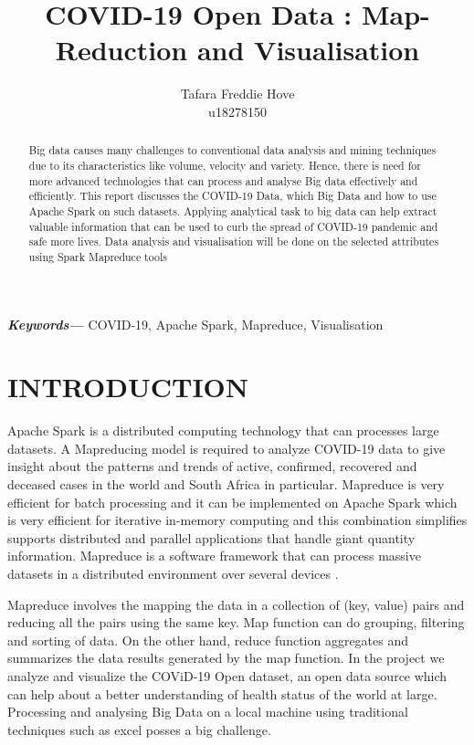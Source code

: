 \documentclass[11pt]{article}
\title{COVID-19 Open Data : Map-Reduction and Visualisation}
\author{Tafara Freddie Hove \\
        \small u18278150 \\
}
\date{}
\providecommand{\keywords}[1]
{
  \small	
  \textbf{\textit{Keywords---}} #1 
}
\begin{document}
\maketitle
\begin{abstract}


Big data  causes many challenges to conventional data analysis and mining  techniques due to its characteristics like volume, velocity and variety. Hence, there is need for more advanced technologies that can process and analyse Big data  effectively and efficiently. This report discusses the COVID-19 Data, which Big Data and how  to use Apache Spark on such datasets. Applying analytical task to big data can help extract valuable information that can be used to curb the spread of COVID-19  pandemic and safe more lives. Data analysis and visualisation will be done on the selected attributes using Spark Mapreduce tools



\end{abstract}\hspace{10pt}
\keywords{COVID-19, Apache Spark, Mapreduce, Visualisation}

\section{INTRODUCTION}
Apache Spark is a distributed computing  technology that can processes large datasets. A Mapreducing model is required to analyze COVID-19 data to give insight about the patterns and trends of active, confirmed, recovered and deceased cases in the world and South Africa in particular. Mapreduce is very efficient for batch processing and it can be implemented on Apache Spark which is very efficient for iterative in-memory computing and this combination simplifies supports distributed and parallel applications that handle giant quantity information. Mapreduce is a software framework  that can process massive datasets in a distributed environment over several devices \cite{}. 

 Mapreduce involves the mapping the data in a collection of (key, value) pairs and reducing all the pairs using the same key. Map function can do grouping, filtering and sorting of data. On the other hand, reduce function aggregates and summarizes the data results generated by the map function. In the project we analyze and visualize the COViD-19 Open dataset, an open data source  which can help about a better understanding of health status of the world at large. Processing and analysing Big Data on a local machine using traditional techniques such as excel posses a big challenge.
 
\end{document}
